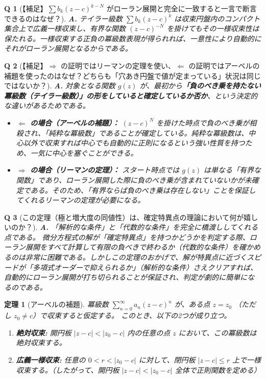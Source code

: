 \documentclass[paper=a4, fontsize=11pt]{jlreq} %
\theoremstyle{break}
\newtheorem{theorem}{定理}[section]
\theoremstyle{qa}
\newtheorem*{Q}{Q}
\theoremstyle{remark} %
\begin{document}
\begin{Q}[【補足】$\sum b_k (z-c)^{k-N}$ がローラン展開と完全に一致すると一言で断言できるのはなぜ？]
\textbf{A.} テイラー級数 $\sum b_k (z-c)^k$ は収束円盤内のコンパクト集合上で広義一様収束し、有界な関数 $(z-c)^{-N}$ を掛けてもその一様収束性は保たれる。一様収束する正負の冪級数表現が得られれば、一意性により自動的にそれがローラン展開となるからである。
\end{Q}

\begin{Q}[【補足】$\Rightarrow$ の証明ではリーマンの定理を使い、$\Leftarrow$ の証明ではアーベルの補題を使ったのはなぜ？どちらも「穴あき円盤で値が定まっている」状況は同じではないか？]
\textbf{A.} 対象となる関数 $g(z)$ が、最初から\textbf{「負のべき乗を持たない冪級数（テイラー級数）」の形をしていると確定しているか否か}、という決定的な違いがあるためである。
\begin{itemize}
    \item \textbf{$\Leftarrow$ の場合（アーベルの補題）：} $(z-c)^N$ を掛けた時点で負のべき乗が相殺され、「純粋な冪級数」であることが確定している。純粋な冪級数は、中心以外で収束すれば中心でも自動的に正則になるという強い性質を持つため、一気に中心を塞ぐことができる。
    \item \textbf{$\Rightarrow$ の場合（リーマンの定理）：} スタート時点では $g(z)$ は単なる「有界な関数」であり、ローラン展開した際に負のべき乗が含まれていないかが未確定である。そのため、「有界ならば負のべき乗は存在しない」ことを保証してくれるリーマンの定理が必要になる。
\end{itemize}
\end{Q}

\begin{Q}[この定理（極と増大度の同値性）は、確定特異点の理論において何が嬉しいのか？]
\textbf{A.} 「解析的な条件」と「代数的な条件」を完全に橋渡ししてくれる点である。
微分方程式の解が「確定特異点」を持つかどうかを判定する際、ローラン展開をすべて計算して有限の負べきで終わるか（代数的な条件）を確かめるのは非常に困難である。しかしこの定理のおかげで、解が特異点に近づくスピードが「多項式オーダーで抑えられるか」（解析的な条件）さえクリアすれば、自動的にローラン展開が打ち切られることが保証され、判定が劇的に簡単になるのである。
\end{Q}
\begin{theorem}[アーベルの補題]\label{thm:abels_lemma}
    冪級数 $\sum_{n=0}^{\infty} a_n (z-c)^n$ が、ある点 $z = z_0$ （ただし $z_0 \neq c$）で収束すると仮定する。
    このとき、以下の2つが成り立つ。
    \begin{enumerate}
        \item \textbf{絶対収束:} 開円板 $|z-c| < |z_0-c|$ 内の任意の点 $z$ において、この冪級数は絶対収束する。
        \item \textbf{広義一様収束:} 任意の $0 < r < |z_0-c|$ に対して、閉円板 $|z-c| \le r$ 上で一様収束する。（したがって、開円板 $|z-c| < |z_0-c|$ 全体で正則関数を定める）
    \end{enumerate}
\end{theorem}
\end{document}
